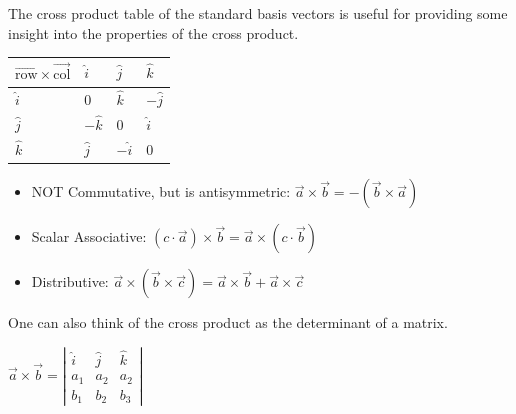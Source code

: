 \noindent
The cross product table of the standard basis vectors is useful for providing some insight into the properties of the cross product.
\begin{table}[h]
	\centering
	\begin{tabular}{|l|l|l|l|}
		\hline
		$\overrightarrow{\text{row}}\times\overrightarrow{\text{col}}$ & $\hat{i}$  & $\hat{j}$  & $\hat{k}$  \\ \hline
		$\hat{i}$                                & $0$        & $\hat{k}$  & $-\hat{j}$ \\ \hline
		$\hat{j}$                                & $-\hat{k}$ & $0$        & $\hat{i}$  \\ \hline
		$\hat{k}$                                & $\hat{j}$  & $-\hat{i}$ & $0$        \\ \hline
	\end{tabular}
\end{table}

\begin{itemize}
	\item NOT Commutative, but is antisymmetric: $\vec{a}\times\vec{b}=-\left(\vec{b}\times\vec{a}\right)$
	\item Scalar Associative: $\left(c\cdot\vec{a}\right)\times\vec{b}=\vec{a}\times\left(c\cdot\vec{b}\right)$
	\item Distributive: $\vec{a}\times\left(\vec{b}\times\vec{c}\right)=\vec{a}\times\vec{b}+\vec{a}\times\vec{c}$
\end{itemize}

\noindent
One can also think of the cross product as the determinant of a matrix.\\
\begin{center}
	$\vec{a}\times\vec{b}=\left|\begin{matrix}\hat{i}& \hat{j} & \hat{k} \\a_1 & a_2 & a_2\\b_1 & b_2 & b_3 \end{matrix}\right|$
\end{center}